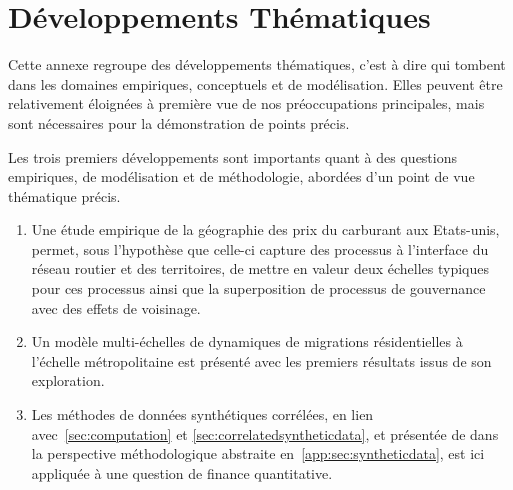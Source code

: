 



\newpage

\chapter{Développements Thématiques}


\label{app:thematic} %



Cette annexe regroupe des développements thématiques, c'est à dire qui tombent dans les domaines empiriques, conceptuels et de modélisation. Elles peuvent être relativement éloignées à première vue de nos préoccupations principales, mais sont nécessaires pour la démonstration de points précis.


Les trois premiers développements sont importants quant à des questions empiriques, de modélisation et de méthodologie, abordées d'un point de vue thématique précis.
\begin{enumerate}
	\item Une étude empirique de la géographie des prix du carburant aux Etats-unis, permet, sous l'hypothèse que celle-ci capture des processus à l'interface du réseau routier et des territoires, de mettre en valeur deux échelles typiques pour ces processus ainsi que la superposition de processus de gouvernance avec des effets de voisinage.
	\item Un modèle multi-échelles de dynamiques de migrations résidentielles à l'échelle métropolitaine est présenté avec les premiers résultats issus de son exploration.
	\item Les méthodes de données synthétiques corrélées, en lien avec~\ref{sec:computation} et \ref{sec:correlatedsyntheticdata}, et présentée de dans la perspective méthodologique abstraite en~\ref{app:sec:syntheticdata}, est ici appliquée à une question de finance quantitative.
\end{enumerate}



